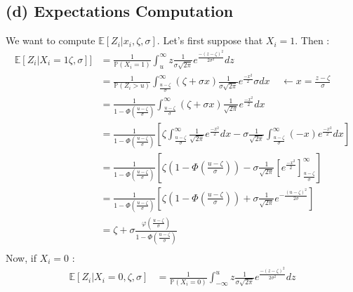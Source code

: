 \documentclass{article}
\begin{document}
\subsection*{(d) Expectations Computation}

We want to compute $\mathbb{E}[Z_i |x_i, \zeta, \sigma]$. Let's first suppose that $X_i=1$. 
Then :
\begin{align*}
    \mathbb{E}[Z_i | X_i=1\zeta, \sigma]] &= \frac{1}{\mathbb{P}(X_i=1)}
                              \int_{u}^{\infty}
                              z
                              \frac{1}{\sigma \sqrt{2\pi}} 
                              e^{ \frac{-(z-\zeta)^2}{2 \sigma^2}  } dz \\
        &= \frac{1}{\mathbb{P}(Z_i > u)}
             \int_{\frac{u-\zeta}{\sigma}}^{\infty} 
             (\zeta+\sigma x) 
             \frac{1}{\sigma \sqrt{2\pi}} 
             e^{ \frac{-x^2}{2}  } 
             \sigma dx \ \ \ \ \ \leftarrow x=\frac{z-\zeta}{\sigma} \\
        &= \frac{1}{1 - \Phi(\frac{u-\zeta}{\sigma})}
            \int_{\frac{u-\zeta}{\sigma}}^{\infty}
            (\zeta+\sigma x) 
            \frac{1}{ \sqrt{2\pi}} 
            e^{ \frac{-x^2}{2}  } 
            dx \\
        &= \frac{1}{1 - \Phi(\frac{u-\zeta}{\sigma})}
            \left [
            \zeta
            \int_{\frac{u-\zeta}{\sigma}}^{\infty}
            \frac{1}{ \sqrt{2\pi}} 
            e^{ \frac{-x^2}{2}  } 
            dx
            -
            \sigma  \frac{1}{\sqrt{2\pi}}
            \int_{\frac{u-\zeta}{\sigma}}^{\infty}
            (-x) 
            e^{ \frac{-x^2}{2}  } 
            dx
            \right ] \\
        &= \frac{1}{1 - \Phi(\frac{u-\zeta}{\sigma} )}
            \left [
            \zeta
            (1 - \Phi \left (\frac{u-\zeta}{\sigma}\right ) )
            -
            \sigma \frac{1}{\sqrt{2\pi}}
            \left [
            e^{ \frac{-x^2}{2}  } 
            \right ]^{\infty}_{\frac{u-\zeta}{\sigma}}
            \right ] \\
        &= \frac{1}{1 - \Phi(\frac{u-\zeta}{\sigma} )}
            \left [
            \zeta
            (1- \Phi \left (\frac{u-\zeta}{\sigma}\right ) )
            +
            \sigma \frac{1}{\sqrt{2\pi}}
            e^{ -\frac{(u-\zeta)^2}{2\sigma}  } 
            \right ] \\
        &= \zeta + \sigma 
        \frac{\varphi \left ( \frac{u-\zeta}{\sigma} \right )}
        {1- \Phi \left (\frac{u-\zeta}{\sigma}\right )} \\
\end{align*}
Now, if $X_i=0$ : 
\begin{align*}
\mathbb{E}[Z_i | X_i=0, \zeta, \sigma] &= \frac{1}{\mathbb{P}(X_i=0)}
    \int_{-\infty}^{u}
    z
    \frac{1}{\sigma \sqrt{2\pi}} 
    e^{ \frac{-(z-\zeta)^2}{2 \sigma^2}  } dz \\
\end{align*}
\end{document}
